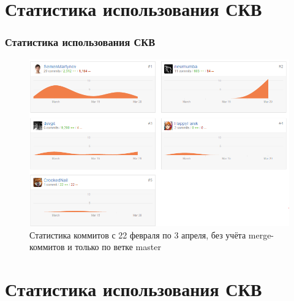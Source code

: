 \documentclass{beamer}
\begin{document}
\section{Статистика использования СКВ}

\begin{frame}
\frametitle{Статистика использования СКВ}

\begin{figure}
\includegraphics[scale=0.47]{res/r2_statistic}
\caption{Статистика коммитов с 22 февраля по 3 апреля, без учёта merge-коммитов и только по ветке master}
\end{figure}


\end{frame}

\section{Статистика использования СКВ}
\end{document}
